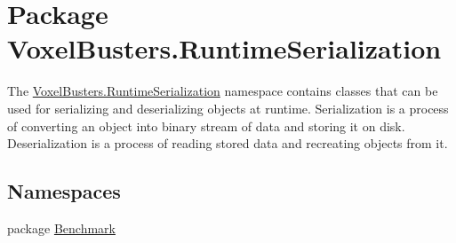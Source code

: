 \hypertarget{namespace_voxel_busters_1_1_runtime_serialization}{}\section{Package Voxel\+Busters.\+Runtime\+Serialization}
\label{namespace_voxel_busters_1_1_runtime_serialization}


The \hyperlink{namespace_voxel_busters_1_1_runtime_serialization}{Voxel\+Busters.\+Runtime\+Serialization} namespace contains classes that can be used for serializing and deserializing objects at runtime. Serialization is a process of converting an object into binary stream of data and storing it on disk. Deserialization is a process of reading stored data and recreating objects from it.  


\subsection*{Namespaces}
\begin{DoxyCompactItemize}
\item 
package \hyperlink{namespace_voxel_busters_1_1_runtime_serialization_1_1_benchmark}{Benchmark}
\end{DoxyCompactItemize}
